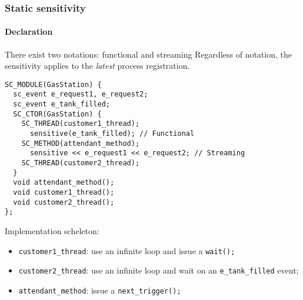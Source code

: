 \begin{frame}[fragile]
\frametitle{Static sensitivity}
\framesubtitle{Declaration}

{\scriptsize
\begin{block}{{\small There exist two notations: functional and streaming}}
\vspace{0.1em}
Regardless of notation, the sensitivity applies to the {\em latest} process registration.
\begin{verbatim}
SC_MODULE(GasStation) {
  sc_event e_request1, e_request2;
  sc_event e_tank_filled;
  SC_CTOR(GasStation) {
    SC_THREAD(customer1_thread);
      sensitive(e_tank_filled); // Functional
    SC_METHOD(attendant_method);
      sensitive << e_request1 << e_request2; // Streaming
    SC_THREAD(customer2_thread);
  }
  void attendant_method();
  void customer1_thread();
  void customer2_thread();
};
\end{verbatim}
\vspace{-0.5em}
\pause
Implementation scheleton:
\begin{itemize}
\item \texttt{customer1\_thread}: use an infinite loop and issue a \texttt{wait();}
\item \texttt{customer2\_thread}: use an infinite loop and wait on an \texttt{e\_tank\_filled} event; 
\item \texttt{attendant\_method}: issue a \texttt{next\_trigger();}
\end{itemize}
\end{block}
}
\end{frame}